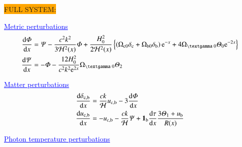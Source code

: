 



\noindent\colorbox{orange}{FULL SYSTEM:}
\par \textcolor{blue}{\underline{Metric perturbations}}
\begin{subequations}\label{mil3:theo:eq:metric_perturbations}
\begin{align}
    \dv{\Phi}{x} &= \Psi - \frac{c^2 k^2}{3\Hp^2(x)} \Phi + \frac{H_0^2}{2\Hp^2(x)}\left\{ \left(\Omega\ped{c 0}\delta\ped{c} + \Omega\ped{b 0}\delta\ped{b} \right)\eu^{-x} +4\Omega\gped{\textgamma 0}\Theta_0 \eu^{-2x} \right\} \\
    \dv{\Psi}{x} &= - \Phi - \frac{12H_0^2}{c^2k^2\eu^{2x}} \Omega\gped{\textgamma 0}\Theta_2 
\end{align}
\end{subequations}

\par \textcolor{blue}{\underline{Matter perturbations}}
\begin{subequations}\label{mil3:theo:eq:matter_perturbations}
\begin{align}
    \dv{\delta\ensuremath{_\mathrm{c, b}}}{x} &=  \frac{ck}{\mathcal{H}} u_\mathrm{c, b} - 3\dv{\ensuremath{\varPhi}}{x}  \\
    \dv{u\ensuremath{_\mathrm{c, b}}}{x} &= - u_\mathrm{c, b} - \frac{ck}{\mathcal{H}}\varPsi + \mathbf{1}_\mathrm{b} \dv{\tau}{x} \frac{3\varTheta_1 +u_\mathrm{b}}{R(x)} 
\end{align}
\end{subequations}

\par \textcolor{blue}{\underline{Photon temperature perturbations}}

